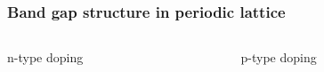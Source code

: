 \documentclass[beamer]{standalone}
\begin{document}
\begin{frame}[t]
 \frametitle{Band gap structure in periodic lattice}
 \begin{columns}[t]
  \begin{column}{0.47\textwidth}
   \begin{block}{n-type doping}
   \end{block}
  \end{column}
  \begin{column}{0.49\textwidth}
   \begin{block}{p-type doping}
   \end{block}
  \end{column}
 \end{columns}
\end{frame}
\end{document}
